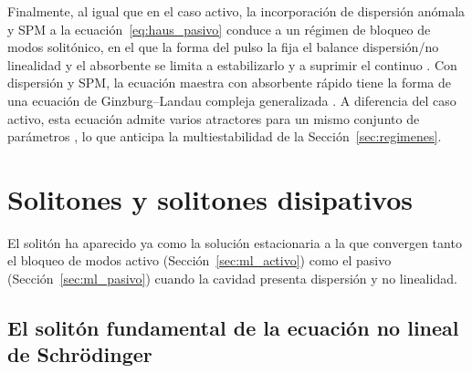 Finalmente, al igual que en el caso activo, la incorporación de dispersión anómala
y SPM a la ecuación~\eqref{eq:haus_pasivo} conduce a un régimen de bloqueo de modos
solitónico, en el que la forma del pulso la fija el balance dispersión\-/no
linealidad y el absorbente se limita a estabilizarlo y a suprimir el continuo
\cite[sec.~9.4.6]{Keller2022}.
Con dispersión y SPM, la ecuación maestra con absorbente rápido tiene la forma de una
ecuación de Ginzburg--Landau compleja generalizada \cite[ec.~6.20]{Kaertner2020}.
A diferencia del caso activo, esta ecuación admite varios atractores para un mismo
conjunto de parámetros \cite{GreluAkhmediev2012}, lo que anticipa la multiestabilidad
de la Sección~\ref{sec:regimenes}.



\section{Solitones y solitones disipativos}
\label{sec:solitones}

El solitón ha aparecido ya como la solución estacionaria a la que convergen tanto
el bloqueo de modos activo (Sección~\ref{sec:ml_activo}) como el pasivo
(Sección~\ref{sec:ml_pasivo}) cuando la cavidad presenta dispersión y no
linealidad.

\subsection{El solitón fundamental de la ecuación no lineal de Schrödinger}
\label{sec:soliton_fundamental}

